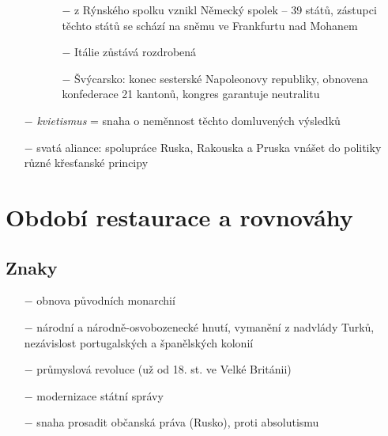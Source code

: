 \documentclass{article}
\begin{document}
\begin{itemize}
\begin{enumerate}
\begin{itemize}
            \item[$-$] z Rýnského spolku vznikl Německý spolek -- 39 států, zástupci těchto států se schází na sněmu ve Frankfurtu nad Mohanem
            \item[$-$] Itálie zůstává rozdrobená
            \item[$-$] Švýcarsko: konec sesterské Napoleonovy republiky, obnovena konfederace 21 kantonů, kongres garantuje neutralitu
        \end{itemize}
    \end{enumerate}
    \item[$-$] \textit{kvietismus} = snaha o neměnnost těchto domluvených výsledků
    \item[$-$] svatá aliance: spolupráce Ruska, Rakouska a Pruska vnášet do politiky různé křesťanské principy
\end{itemize}

\section*{Období restaurace a rovnováhy}

\subsection*{Znaky}
\begin{itemize}
    \vspace{-0.5em}
    \setlength\itemsep{0.15em}
    \item[$-$] obnova původních monarchií
    \item[$-$] národní a národně-osvobozenecké hnutí, vymanění z nadvlády Turků, nezávislost portugalských a španělských kolonií
    \item[$-$] průmyslová revoluce (už od 18. st. ve Velké Británii)
    \item[$-$] modernizace státní správy
    \item[$-$] snaha prosadit občanská práva (Rusko), proti absolutismu
\end{itemize}
\end{document}
